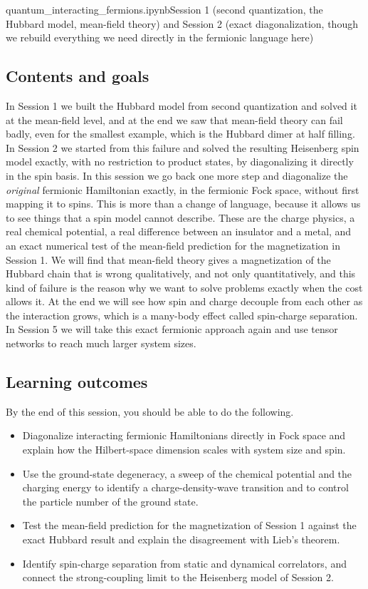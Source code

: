 \documentclass[lecture_notes.tex]{subfiles}
\begin{document}
%
  {quantum\_interacting\_fermions.ipynb}{Session 1 (second quantization, the Hubbard model,
  mean-field theory) and Session 2 (exact diagonalization, though we rebuild everything we need
  directly in the fermionic language here)}

\subsection*{Contents and goals}
In Session 1 we built the Hubbard model from second quantization and solved it at the mean-field
level, and at the end we saw that mean-field theory can fail badly, even for the smallest example,
which is the Hubbard dimer at half filling. In Session 2 we started from this failure and solved
the resulting Heisenberg spin model exactly, with no restriction to product states, by
diagonalizing it directly in the spin basis. In this session we go back one more step and
diagonalize the \emph{original} fermionic Hamiltonian exactly, in the fermionic Fock space, without
first mapping it to spins. This is more than a change of language, because it allows us to see
things that a spin model cannot describe. These are the charge physics, a real chemical potential,
a real difference between an insulator and a metal, and an exact numerical test of the mean-field
prediction for the magnetization in Session 1. We will find that mean-field theory gives a
magnetization of the Hubbard chain that is wrong qualitatively, and not only quantitatively, and
this kind of failure is the reason why we want to solve problems exactly when the cost allows it.
At the end we will see how spin and charge decouple from each other as the interaction grows,
which is a many-body effect called spin-charge separation. In Session 5 we will take this exact
fermionic approach again and use tensor networks to reach much larger system sizes.

\subsection*{Learning outcomes}
By the end of this session, you should be able to do the following.
\begin{itemize}[nosep]
  \item Diagonalize interacting fermionic Hamiltonians directly in Fock space and explain how the
    Hilbert-space dimension scales with system size and spin.
  \item Use the ground-state degeneracy, a sweep of the chemical potential and the charging energy
    to identify a charge-density-wave transition and to control the particle number of the ground
    state.
  \item Test the mean-field prediction for the magnetization of Session 1 against the exact
    Hubbard result and explain the disagreement with Lieb's theorem.
  \item Identify spin-charge separation from static and dynamical correlators, and connect the
    strong-coupling limit to the Heisenberg model of Session 2.
\end{itemize}
\end{document}
